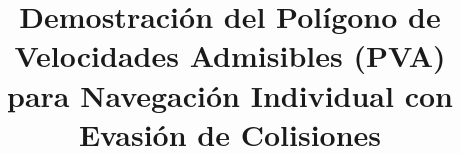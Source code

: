 \documentclass[conference]{IEEEtran}
\begin{document}
\title{Demostración del Polígono de Velocidades Admisibles (PVA) para Navegación Individual con Evasión de Colisiones}



\maketitle













% 
% 
% 



\end{document}
